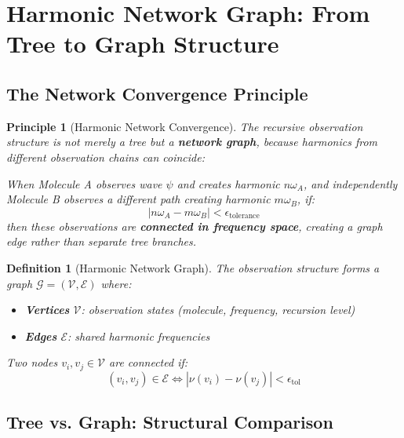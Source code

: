 \documentclass[12pt,a4paper]{article}
\newtheorem{definition}[theorem]{Definition}
\newtheorem{principle}[theorem]{Principle}
\begin{document}
\section{Harmonic Network Graph: From Tree to Graph Structure}

\subsection{The Network Convergence Principle}

\begin{principle}[Harmonic Network Convergence]
The recursive observation structure is not merely a tree but a \textbf{network graph}, because harmonics from different observation chains can coincide:

When Molecule A observes wave $\psi$ and creates harmonic $n\omega_A$, and independently Molecule B observes a different path creating harmonic $m\omega_B$, if:
\begin{equation}
|n\omega_A - m\omega_B| < \epsilon_{\text{tolerance}}
\end{equation}
then these observations are \textbf{connected in frequency space}, creating a graph edge rather than separate tree branches.
\end{principle}

\begin{definition}[Harmonic Network Graph]
The observation structure forms a graph $\mathcal{G} = (\mathcal{V}, \mathcal{E})$ where:
\begin{itemize}
\item \textbf{Vertices} $\mathcal{V}$: observation states (molecule, frequency, recursion level)
\item \textbf{Edges} $\mathcal{E}$: shared harmonic frequencies
\end{itemize}

Two nodes $v_i, v_j \in \mathcal{V}$ are connected if:
\begin{equation}
(v_i, v_j) \in \mathcal{E} \iff |\nu(v_i) - \nu(v_j)| < \epsilon_{\text{tol}}
\end{equation}
\end{definition}

\subsection{Tree vs. Graph: Structural Comparison}
\end{document}
